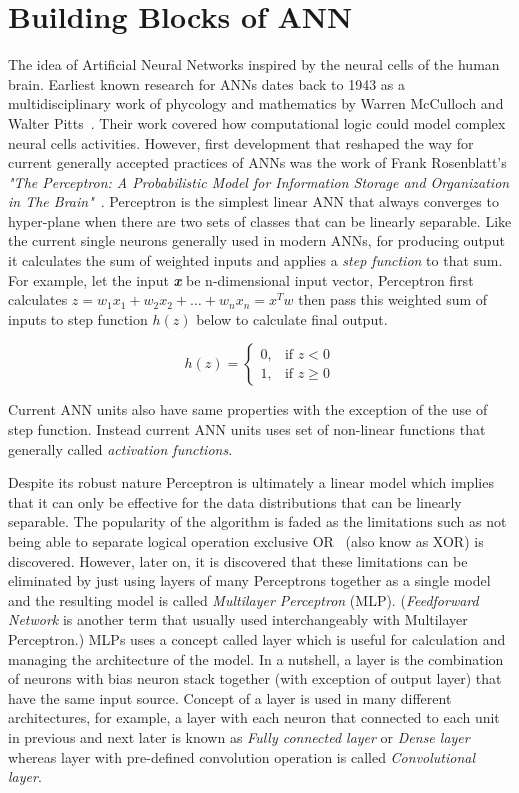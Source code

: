\section{Building Blocks of ANN} \label{sec:bbann}
The idea of Artificial Neural Networks inspired by the neural cells of the human brain. Earliest known research for ANNs dates back to 1943 as a multidisciplinary work of phycology and mathematics by Warren McCulloch and Walter Pitts~\cite{firstann}. Their work covered how computational logic could model complex neural cells activities. However, first development that reshaped the way for current generally accepted practices of ANNs was the work of Frank Rosenblatt's  \emph{"The Perceptron: A Probabilistic Model for Information Storage and Organization in The Brain"}~\cite{perceptron}. Perceptron is the simplest linear ANN that always converges to hyper-plane when there are two sets of classes that can be linearly separable. Like the current single neurons generally used in modern ANNs, for producing output it calculates the sum of weighted inputs and applies a \emph{step function} to that sum. For example, let the input \textbf{\textit{x}} be n-dimensional input vector, Perceptron first calculates \(z = w_1x_1 + w_2x_2 + \ldots + w_nx_n = x^Tw\) then pass this weighted sum of inputs to step function \(h(z)\) below to calculate final output. 

\begin{equation} \label{eq:stepfunc21}
h(z)=
\begin{cases}
    0, & \text{if } z< 0\\
    1, & \text{if } z\geq 0
\end{cases}    
\end{equation}

Current ANN units also have same properties with the exception of the use of step function. Instead current ANN units uses set of non-linear functions that generally called \emph{activation functions}. 

Despite its robust nature Perceptron is ultimately a linear model which implies that it can only be effective for the data distributions that can be linearly separable.
The popularity of the algorithm is faded as the limitations such as not being able to separate logical operation exclusive OR~\cite{marvinperceptrons} (also know as XOR) is discovered.
However, later on, it is discovered that these limitations can be eliminated by just using layers of many Perceptrons together as a single model and the resulting model is called \emph{Multilayer Perceptron} (MLP). 
(\emph{Feedforward Network} is another term that usually used interchangeably with Multilayer Perceptron.)
MLPs uses a concept called layer which is useful for calculation and managing the architecture of the model.
In a nutshell, a layer is the combination of neurons with bias neuron stack together (with exception of output layer) that have the same input source.
Concept of a layer is used in many different architectures, for example, a layer with each neuron that connected to each unit in previous and next later is known as \emph{Fully connected layer} or \emph{Dense layer} whereas layer with pre-defined convolution operation is called \emph{Convolutional layer}. 

